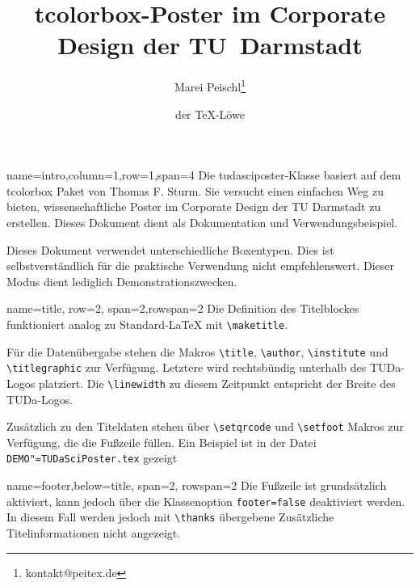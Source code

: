 \documentclass[
	accentcolor=9c,
	]{tudasciposter}
\newcommand{\tbs}{\textbackslash}
\let\code\texttt
\newcommand*{\macro}[1]{\code{\tbs#1}}
\let\file\texttt
\let\pck\textsf
\let\cls\textsf
\begin{document}
\title{\pck{tcolorbox}-Poster im Corporate Design der TU~Darmstadt}
\author{Marei Peischl\thanks{kontakt@peitex.de} \and der \TeX-Löwe}


\begin{tcbposter}[
	poster={
		columns=4,
		rows=7,
		spacing=1cm,
	},]

	\begin{posterboxenv}[title=Zusammenfassung]{name=intro,column=1,row=1,span=4}
	Die \cls{tudasciposter}-Klasse basiert auf dem \pck{tcolorbox} Paket von Thomas F. Sturm.
	Sie versucht einen einfachen Weg zu bieten, wissenschaftliche Poster im Corporate Design der TU Darmstadt zu erstellen. Dieses Dokument dient als Dokumentation und Verwendungsbeispiel.

	Dieses Dokument verwendet unterschiedliche Boxentypen. Dies ist selbstverständlich für die praktische Verwendung nicht empfehlenswert. Dieser Modus dient lediglich Demonstrationszwecken.
	\end{posterboxenv}

	\begin{posterboxenv}[title=Titelei]{name=title, row=2, span=2,rowspan=2}
	Die Definition des Titelblockes funktioniert analog zu Standard-\LaTeX{} mit \macro{maketitle}.

	Für die Datenübergabe stehen die Makros \macro{title}, \macro{author}, \macro{institute} und \macro{titlegraphic} zur Verfügung. Letztere wird rechtsbündig  unterhalb des TUDa-Logos platziert. Die \macro{linewidth} zu diesem Zeitpunkt entspricht der Breite des TUDa-Logos.

	Zusätzlich zu den Titeldaten stehen über \macro{setqrcode} und \macro{setfoot} Makros zur Verfügung, die die Fußzeile füllen.
	Ein Beispiel ist in der Datei \file{DEMO"=TUDaSciPoster.tex} gezeigt
	\end{posterboxenv}

\begin{posterboxenv}[title=Fußzeile]{name=footer,below=title, span=2, rowspan=2 }
	Die Fußzeile ist grundsätzlich aktiviert, kann jedoch über die Klassenoption \code{footer=false} deaktiviert werden. In diesem Fall werden jedoch mit \macro{thanks} übergebene Zusätzliche Titelinformationen nicht angezeigt.


\end{posterboxenv}
\end{tcbposter}
\end{document}

